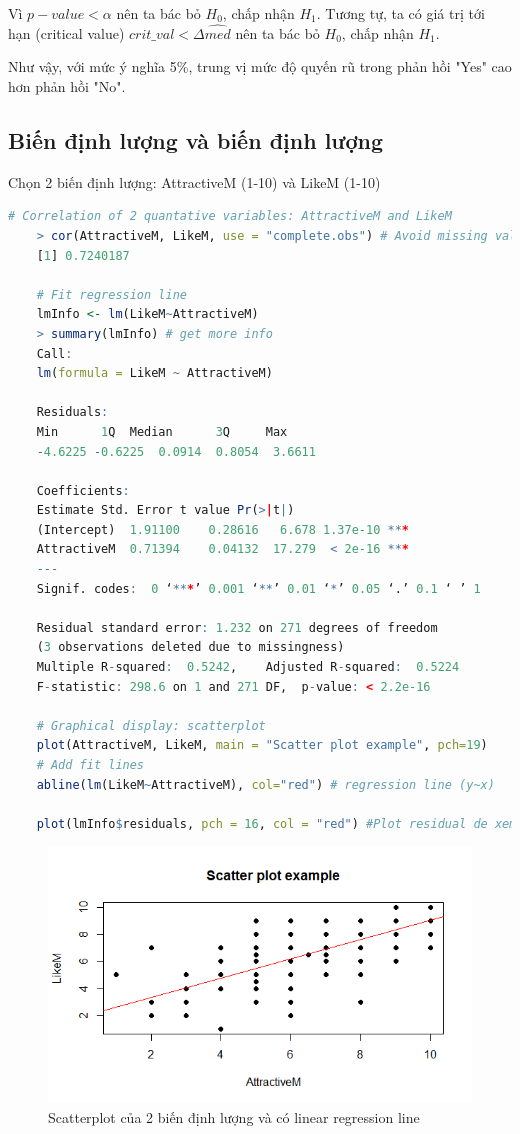 \documentclass[a4paper,12pt]{article}
\begin{document}
	Vì $p-value < \alpha$ nên ta bác bỏ $H_0$, chấp nhận $H_1$. Tương tự, ta có giá trị tới hạn (critical value) $crit\_val < \Delta\hat{med}$ nên ta bác bỏ $H_0$, chấp nhận $H_1$. 
	
	Như vậy, với mức ý nghĩa 5\%, trung vị mức độ quyến rũ trong phản hồi "Yes" cao hơn phản hồi "No".
	
	\subsection{Biến định lượng và biến định lượng}
	Chọn 2 biến định lượng: AttractiveM (1-10) và LikeM (1-10)
	\begin{lstlisting}[language=R]
	# Correlation of 2 quantative variables: AttractiveM and LikeM
	> cor(AttractiveM, LikeM, use = "complete.obs") # Avoid missing values
	[1] 0.7240187
	
	# Fit regression line
	lmInfo <- lm(LikeM~AttractiveM)
	> summary(lmInfo) # get more info
	Call:
	lm(formula = LikeM ~ AttractiveM)
	
	Residuals:
	Min      1Q  Median      3Q     Max 
	-4.6225 -0.6225  0.0914  0.8054  3.6611 
	
	Coefficients:
	Estimate Std. Error t value Pr(>|t|)    
	(Intercept)  1.91100    0.28616   6.678 1.37e-10 ***
	AttractiveM  0.71394    0.04132  17.279  < 2e-16 ***
	---
	Signif. codes:  0 ‘***’ 0.001 ‘**’ 0.01 ‘*’ 0.05 ‘.’ 0.1 ‘ ’ 1
	
	Residual standard error: 1.232 on 271 degrees of freedom
	(3 observations deleted due to missingness)
	Multiple R-squared:  0.5242,	Adjusted R-squared:  0.5224 
	F-statistic: 298.6 on 1 and 271 DF,  p-value: < 2.2e-16
	
	# Graphical display: scatterplot
	plot(AttractiveM, LikeM, main = "Scatter plot example", pch=19)
	# Add fit lines
	abline(lm(LikeM~AttractiveM), col="red") # regression line (y~x)
	
	plot(lmInfo$residuals, pch = 16, col = "red") #Plot residual de xem du lieu co phan bo ngau nhieu khong?
	\end{lstlisting}
	
	\begin{figure}[H]
		\centering
		\includegraphics[width=0.7\linewidth]{Rplot6}
		\caption{Scatterplot của 2 biến định lượng và có linear regression line}
		\label{fig:rplot6}
	\end{figure}
	
\end{document}
